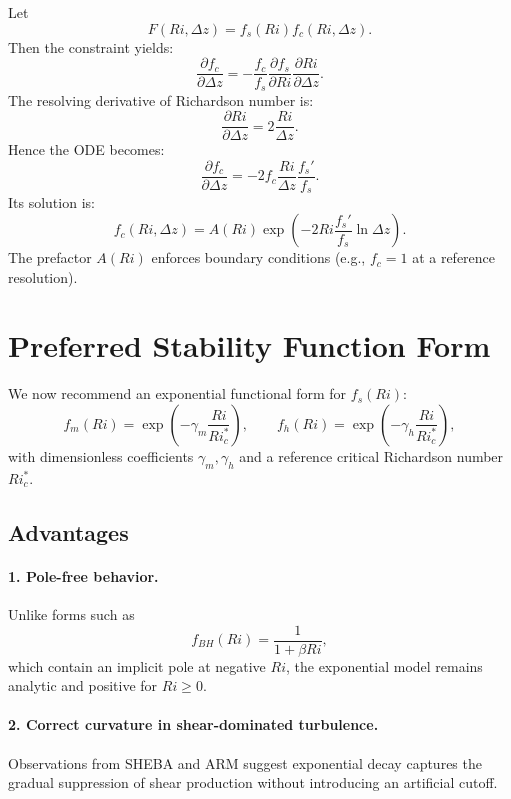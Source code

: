 \documentclass[12pt]{article}
\begin{document}
Let
\begin{equation}
    F(Ri,\Delta z) = f_s(Ri) f_c(Ri,\Delta z).
\end{equation}
Then the constraint yields:
\begin{equation}
    \frac{\partial f_c}{\partial \Delta z} = - \frac{f_c}{f_s} \frac{\partial f_s}{\partial Ri} \frac{\partial Ri}{\partial \Delta z}.
\end{equation}
The resolving derivative of Richardson number is:
\begin{equation}
    \frac{\partial Ri}{\partial \Delta z} = 2\frac{Ri}{\Delta z}.
\end{equation}
Hence the ODE becomes:
\begin{equation}
    \frac{\partial f_c}{\partial \Delta z} = -2 f_c \frac{Ri}{\Delta z} \frac{f_s'}{f_s}.
\end{equation}
Its solution is:
\begin{equation}
    f_c(Ri,\Delta z) = A(Ri) \exp\left(-2 Ri \frac{f_s'}{f_s} \ln \Delta z\right).
\end{equation}
The prefactor \(A(Ri)\) enforces boundary conditions (e.g., \(f_c=1\) at a reference resolution).

\section{Preferred Stability Function Form}

We now recommend an exponential functional form for \(f_s(Ri)\):
\begin{equation}
    f_m(Ri) = \exp\left(-\gamma_m \frac{Ri}{Ri_c^*}\right),
    \qquad
    f_h(Ri) = \exp\left(-\gamma_h \frac{Ri}{Ri_c^*}\right),
\end{equation}
with dimensionless coefficients \(\gamma_m, \gamma_h\) and a reference critical Richardson number \(Ri_c^*\).

\subsection{Advantages}

\paragraph{1. Pole-free behavior.} Unlike forms such as
\[
    f_{BH}(Ri) = \frac{1}{1 + \beta Ri},
\]
which contain an implicit pole at negative \(Ri\), the exponential model remains analytic and positive for \(Ri \ge 0\).

\paragraph{2. Correct curvature in shear-dominated turbulence.} Observations from SHEBA and ARM suggest exponential decay captures the gradual suppression of shear production without introducing an artificial cutoff.
\end{document}
